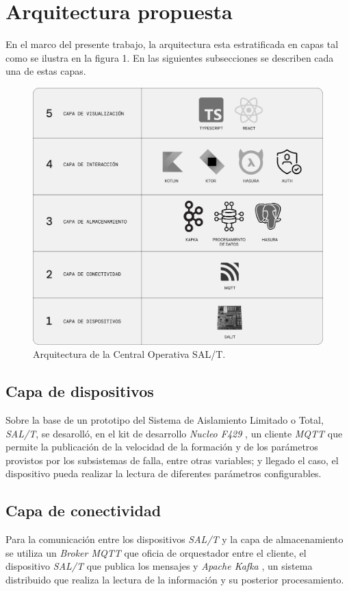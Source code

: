 \documentclass[a4paper]{IEEEtran}
\begin{document}
\section{Arquitectura propuesta}

En el marco del presente trabajo, la arquitectura esta estratificada en capas
tal como se ilustra en la figura 1. En las siguientes subsecciones se describen cada una de estas capas.

\begin{figure}[ht]
\centering 
\includegraphics[width=.48\textwidth]{images/iot-stack-v2.1.png}
\caption{Arquitectura de la Central Operativa SAL/T.}
\label{fig:diagBloques}
\end{figure}

\subsection{Capa de dispositivos}

Sobre la base de un prototipo del Sistema de Aislamiento Limitado o Total, \textit{SAL/T}, se desarolló, en el kit de desarrollo \textit{Nucleo F429} \cite{b5}, un cliente \textit{MQTT} \cite{b6} que permite la publicación de la velocidad de la formación y de los parámetros provistos por los subsistemas de falla, entre otras variables; y llegado el caso, el dispositivo pueda realizar la lectura de diferentes parámetros configurables.

\subsection{Capa de conectividad}

Para la comunicación entre los dispositivos \textit{SAL/T} y la capa de almacenamiento se utiliza un \textit{Broker MQTT} que oficia de orquestador entre el cliente, el dispositivo \textit{SAL/T} que publica los mensajes y \textit{Apache Kafka} \cite{b7}, un sistema distribuido que realiza la lectura de la información y su posterior procesamiento. 
\end{document}

